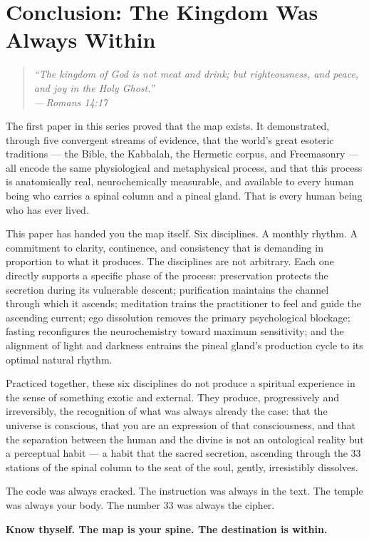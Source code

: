 \documentclass[12pt, a4paper]{article}
\newcommand{\epigraph}[2]{%
  \begin{quote}
    \itshape ``#1''\\[0.3em]
    \normalfont\small\hfill ---\,#2
  \end{quote}
}
\begin{document}
\section{Conclusion: The Kingdom Was Always Within}
\label{sec:conclusion}

\epigraph{The kingdom of God is not meat and drink; but righteousness, and
peace, and joy in the Holy Ghost.}{Romans 14:17}

The first paper in this series proved that the map exists. It demonstrated,
through five convergent streams of evidence, that the world's great esoteric
traditions — the Bible, the Kabbalah, the Hermetic corpus, and Freemasonry —
all encode the same physiological and metaphysical process, and that this
process is anatomically real, neurochemically measurable, and available to
every human being who carries a spinal column and a pineal gland. That is
every human being who has ever lived.

This paper has handed you the map itself. Six disciplines. A monthly rhythm.
A commitment to clarity, continence, and consistency that is demanding in
proportion to what it produces. The disciplines are not arbitrary. Each one
directly supports a specific phase of the process: preservation protects the
secretion during its vulnerable descent; purification maintains the channel
through which it ascends; meditation trains the practitioner to feel and guide
the ascending current; ego dissolution removes the primary psychological
blockage; fasting reconfigures the neurochemistry toward maximum sensitivity;
and the alignment of light and darkness entrains the pineal gland's production
cycle to its optimal natural rhythm.

Practiced together, these six disciplines do not produce a spiritual experience
in the sense of something exotic and external. They produce, progressively and
irreversibly, the recognition of what was always already the case: that the
universe is conscious, that you are an expression of that consciousness, and
that the separation between the human and the divine is not an ontological
reality but a perceptual habit — a habit that the sacred secretion, ascending
through the 33 stations of the spinal column to the seat of the soul, gently,
irresistibly dissolves.

The code was always cracked. The instruction was always in the text. The temple
was always your body. The number 33 was always the cipher.

\vspace{1.5em}
\noindent\textbf{Know thyself. The map is your spine. The destination is
within.}

\newpage
\printbibliography[title={Bibliography}]
\end{document}
